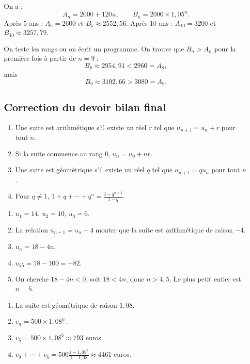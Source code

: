 \documentclass[11pt,a4paper]{article}
\begin{document}
\begin{correctionbox}[Bilan 4]
On a :
\[
A_n=2000+120n,
\qquad
B_n=2000\times1{,}05^n.
\]
Après $5$ ans : $A_5=2600$ et $B_5\approx2552{,}56$. Après $10$ ans : $A_{10}=3200$ et $B_{10}\approx3257{,}79$.

On teste les rangs ou on écrit un programme. On trouve que $B_n>A_n$ pour la première fois à partir de $n=9$ :
\[
B_8\approx2954{,}91<2960=A_8,
\]
mais
\[
B_9\approx3102{,}66>3080=A_9.
\]
\end{correctionbox}

\subsection*{Correction du devoir bilan final}

\begin{correctionbox}[Exercice 1]
\begin{enumerate}
  \item Une suite est arithmétique s'il existe un réel $r$ tel que $u_{n+1}=u_n+r$ pour tout $n$.
  \item Si la suite commence au rang $0$, $u_n=u_0+nr$.
  \item Une suite est géométrique s'il existe un réel $q$ tel que $u_{n+1}=qu_n$ pour tout $n$.
  \item Pour $q\neq1$, $1+q+\cdots+q^n=\frac{1-q^{n+1}}{1-q}$.
\end{enumerate}
\end{correctionbox}

\begin{correctionbox}[Exercice 2]
\begin{enumerate}
  \item $u_1=14$, $u_2=10$, $u_3=6$.
  \item La relation $u_{n+1}=u_n-4$ montre que la suite est arithmétique de raison $-4$.
  \item $u_n=18-4n$.
  \item $u_{25}=18-100=-82$.
  \item On cherche $18-4n<0$, soit $18<4n$, donc $n>4{,}5$. Le plus petit entier est $n=5$.
\end{enumerate}
\end{correctionbox}

\begin{correctionbox}[Exercice 3]
\begin{enumerate}
  \item La suite est géométrique de raison $1{,}08$.
  \item $v_n=500\times1{,}08^n$.
  \item $v_6=500\times1{,}08^6\approx793$ euros.
  \item $v_0+\cdots+v_6=500\frac{1-1{,}08^7}{1-1{,}08}\approx4461$ euros.
\end{enumerate}
\end{correctionbox}
\end{document}
